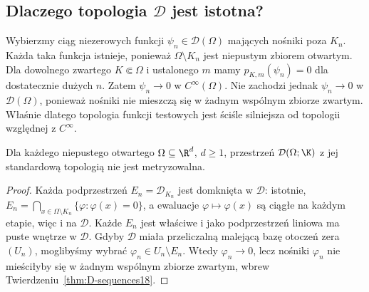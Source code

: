 \subsection{Dlaczego topologia \texorpdfstring{$\mathcal D$}{D} jest istotna?}

\begin{przyklad}
\label{ex:escaping18}
Wybierzmy ciąg niezerowych funkcji $\psi_n\in\mathcal D(\Omega)$
mających nośniki poza $K_n$. Każda taka funkcja istnieje,
ponieważ $\Omega\setminus K_n$ jest niepustym zbiorem otwartym.
Dla dowolnego zwartego $K\Subset\Omega$ i ustalonego $m$
mamy $p_{K,m}(\psi_n)=0$ dla dostatecznie dużych $n$.
Zatem $\psi_n\to0$ w $C^\infty(\Omega)$.
Nie zachodzi jednak $\psi_n\to0$ w $\mathcal D(\Omega)$,
ponieważ nośniki nie mieszczą się w żadnym wspólnym
zbiorze zwartym. Właśnie dlatego topologia funkcji testowych
jest ściśle silniejsza od topologii względnej z $C^\infty$.
\end{przyklad}

\begin{twierdzenie}[Niemetryzowalność]
\label{thm:D-nonmetric18}
Dla każdego niepustego otwartego $\Omega\subseteq\R^d$,
$d\ge1$, przestrzeń $\mathcal D(\Omega;\K)$ z jej
standardową topologią nie jest metryzowalna.
\end{twierdzenie}
\begin{proof}
Każda podprzestrzeń $E_n=\mathcal D_{K_n}$ jest domknięta
w $\mathcal D$: istotnie,
$E_n=\bigcap_{x\in\Omega\setminus K_n}\{\varphi:\varphi(x)=0\}$,
a ewaluacje $\varphi\mapsto\varphi(x)$ są ciągłe
na każdym etapie, więc i na $\mathcal D$.
Każde $E_n$ jest właściwe i jako podprzestrzeń liniowa
ma puste wnętrze w $\mathcal D$.
Gdyby $\mathcal D$ miała przeliczalną malejącą bazę
otoczeń zera $(U_n)$, moglibyśmy wybrać
$\varphi_n\in U_n\setminus E_n$. Wtedy
$\varphi_n\to0$, lecz nośniki $\varphi_n$ nie mieściłyby
się w żadnym wspólnym zbiorze zwartym, wbrew
Twierdzeniu~\ref{thm:D-sequences18}.
\end{proof}

